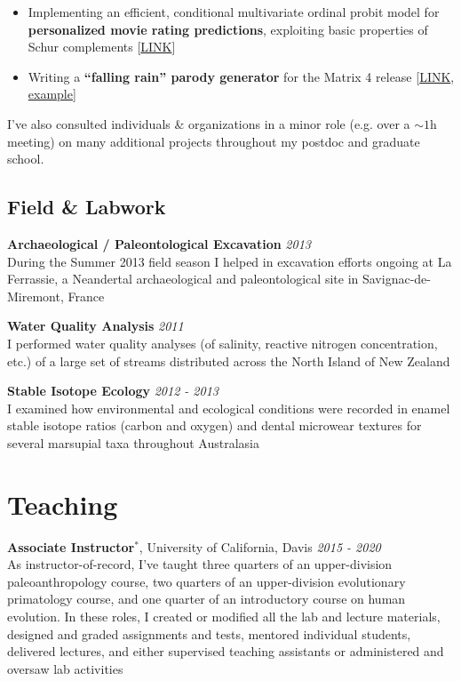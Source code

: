 \documentclass[12pt]{article}
\begin{document}
\begin{itemize}[noitemsep]
\item Implementing an efficient, conditional multivariate ordinal probit model for \textbf{personalized movie rating predictions}, exploiting basic properties of Schur complements [\href{https://github.com/NikVetr/side\_projects/blob/24f7e38876a95433364123441f9b41d260105be6/movieRatingPersonalization.R}{LINK}]

\item Writing a \textbf{``falling rain'' parody generator} for the Matrix 4 release [\href{https://github.com/NikVetr/montgomery\_lab/blob/61e2ac4b0fea0ee7f5bf31590a40378f0027264a/Matrix\_GreenRain.R#L4}{LINK},  \href{https://drive.google.com/file/d/1hwzzLq9xTpAc2AvFyLTy-L\_ZHG\_VlIK\_}{example}]


\end{itemize}

I've also consulted individuals \& organizations in a minor role (e.g. over a $\sim 1$h meeting) on many additional projects throughout my postdoc and graduate school.

\subsection{Field \& Labwork}

\textbf{Archaeological / Paleontological Excavation} \hfill \emph{2013}\\
During the Summer 2013 field season I helped in excavation efforts ongoing at La Ferrassie, a Neandertal archaeological and paleontological site in Savignac-de-Miremont, France

\textbf{Water Quality Analysis} \hfill \emph{2011}\\
I performed water quality analyses (of salinity, reactive nitrogen concentration, etc.) of a large set of streams distributed across the North Island of New Zealand

\textbf{Stable Isotope Ecology} \hfill \emph{2012 - 2013}\\
I examined how environmental and ecological conditions were recorded in enamel stable isotope ratios (carbon and oxygen) and dental microwear textures for several marsupial taxa throughout Australasia

\section{Teaching}

\textbf{Associate Instructor$^{*}$}, University of California, Davis \hfill \emph{2015  - 2020}\\
As instructor-of-record, I’ve taught three quarters of an upper-division paleoanthropology course, two quarters of an upper-division evolutionary primatology course, and one quarter of an introductory course on human evolution. In these roles, I created or modified all the lab and lecture materials, designed and graded assignments and tests, mentored individual students, delivered lectures, and either supervised teaching assistants or administered and oversaw lab activities
\end{document}
